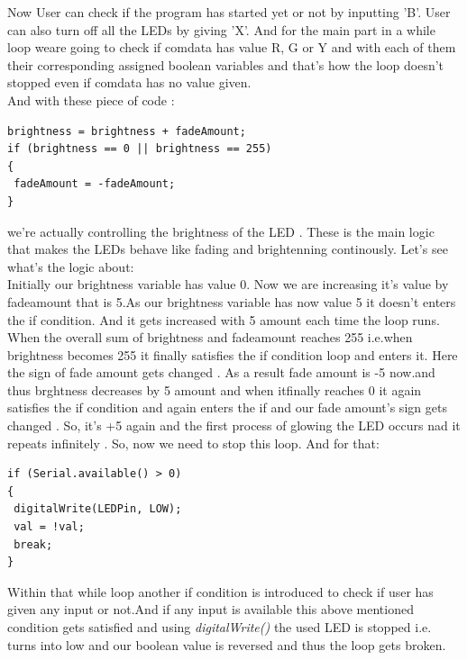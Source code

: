 \documentclass[a4paper]{article}
\begin{document}
Now User can check if the program has started yet or not by inputting 'B'.
User can also turn off all the LEDs by giving 'X'.
And for the main part in a while loop weare going to check if comdata has value R, G or Y and with each of them their corresponding assigned boolean variables and that's how the loop doesn't stopped even if comdata has no value given.
\\
And with these piece of code :
\begin{lstlisting}[language=Arduino]
brightness = brightness + fadeAmount;
if (brightness == 0 || brightness == 255)
{
 fadeAmount = -fadeAmount;
}
\end{lstlisting}
we're actually controlling the brightness of the LED . These is the main logic that makes the LEDs behave like fading and brightenning continously.
Let's see what's the logic about:
\\
Initially our brightness variable has value 0. Now we are increasing it's value by fadeamount that is 5.As our brightness variable has now value 5 it doesn't enters the if condition. And it gets increased with 5 amount each time the loop runs. When the overall sum of brightness and fadeamount reaches 255 i.e.when brightness becomes 255 it finally satisfies the if condition loop and enters it. Here the sign of fade amount  gets changed . As a result fade amount is -5 now.and thus brghtness decreases by 5 amount and when itfinally reaches 0 it again satisfies the if condition and again enters the if and our fade amount's sign gets changed . So, it's +5 again and the first process of glowing the LED occurs nad it repeats infinitely . So, now we need to stop this loop. And for that:
\begin{lstlisting}[language=Arduino]
if (Serial.available() > 0)
{
 digitalWrite(LEDPin, LOW);
 val = !val;
 break;
}
\end{lstlisting}
Within that while loop another if condition is introduced to check if user has given any input or not.And if any input is available this above mentioned condition gets satisfied and using \textit{digitalWrite()} the used LED is stopped i.e. turns into low and our boolean value is reversed and thus the loop gets broken.
\end{document}
